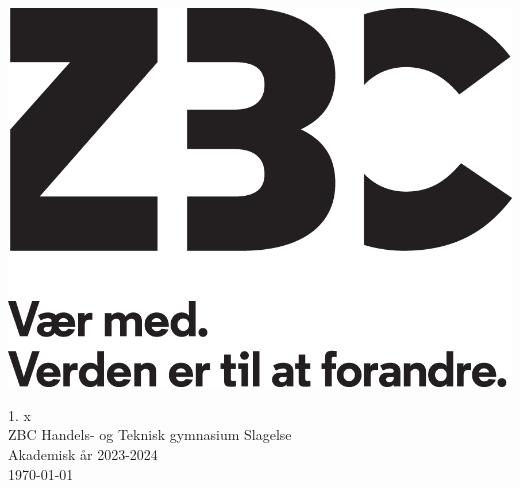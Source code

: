 \begin{titlepage}
    


    \vspace{1cm}

    \includegraphics[width=.7\textwidth]{./assets/zbc_logo_black.jpg}

    \vfill

    1. x \\
    ZBC Handels- og Teknisk gymnasium Slagelse \\
    Akademisk år 2023-2024 \\
    \today
\end{titlepage}